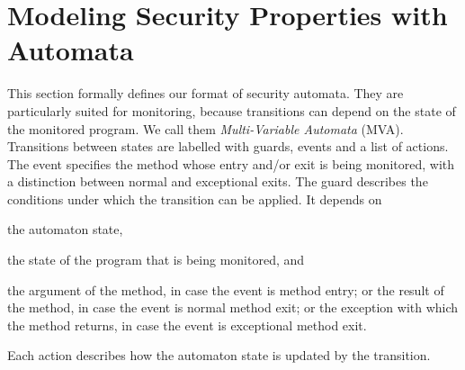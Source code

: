 \section{Modeling Security Properties with Automata}\label{SecMVA}

This section formally defines our format of security automata. They
are particularly suited for monitoring, because transitions can depend
on the state of the monitored program. We call them
\emph{Multi-Variable Automata} (MVA). %
Transitions between states are labelled with guards, events and a list
of actions. The event specifies the method whose entry and/or exit is
being monitored, with a distinction between normal and exceptional
exits.  The guard describes the conditions under which the transition
can be applied. It depends on
\begin{inparaenum}
\item the automaton state,
\item the state of the program that is being monitored, and
\item the argument of the method, in case the event is method entry; or
the result of the method, in case the event is normal method exit; or
the exception with which the method returns, in case the event is
exceptional method exit.
\end{inparaenum}
Each action describes how the automaton state is updated by the transition.

